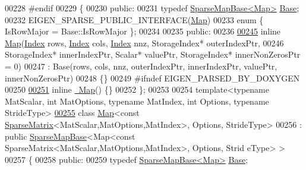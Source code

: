 \begin{DoxyCode}
00228 \textcolor{preprocessor}{#endif}
00229 \{
00230   \textcolor{keyword}{public}:
00231     \textcolor{keyword}{typedef} \hyperlink{class_eigen_1_1_sparse_map_base}{SparseMapBase<Map>} \hyperlink{class_eigen_1_1_sparse_map_base}{Base};
00232     EIGEN\_SPARSE\_PUBLIC\_INTERFACE(\hyperlink{group___core___module_class_eigen_1_1_map}{Map})
00233     \textcolor{keyword}{enum} \{ IsRowMajor = Base::IsRowMajor \};
00234 
00235   \textcolor{keyword}{public}:
00236 
\hyperlink{group___sparse_core___module_a634ffe6952d21716ca879e107f620f19}{00245}     \textcolor{keyword}{inline} \hyperlink{group___sparse_core___module_a634ffe6952d21716ca879e107f620f19}{Map}(\hyperlink{namespace_eigen_a62e77e0933482dafde8fe197d9a2cfde}{Index} rows, \hyperlink{namespace_eigen_a62e77e0933482dafde8fe197d9a2cfde}{Index} cols, \hyperlink{namespace_eigen_a62e77e0933482dafde8fe197d9a2cfde}{Index} nnz, StorageIndex* outerIndexPtr,
00246                StorageIndex* innerIndexPtr, Scalar* valuePtr, StorageIndex* innerNonZerosPtr = 0)
00247       : Base(rows, cols, nnz, outerIndexPtr, innerIndexPtr, valuePtr, innerNonZerosPtr)
00248     \{\}
00249 \textcolor{preprocessor}{#ifndef EIGEN\_PARSED\_BY\_DOXYGEN}
00250 
\hyperlink{group___sparse_core___module_a4d2900fdd8c973d24c4cfb0f0ee4f53f}{00251}     \textcolor{keyword}{inline} \hyperlink{group___sparse_core___module_a4d2900fdd8c973d24c4cfb0f0ee4f53f}{~Map}() \{\}
00252 \};
00253 
00254 \textcolor{keyword}{template}<\textcolor{keyword}{typename} MatScalar, \textcolor{keywordtype}{int} MatOptions, \textcolor{keyword}{typename} MatIndex, \textcolor{keywordtype}{int} Options, \textcolor{keyword}{typename} Str\textcolor{keywordtype}{id}eType>
\hyperlink{class_eigen_1_1_map_3_01const_01_sparse_matrix_3_01_mat_scalar_00_01_mat_options_00_01_mat_index4032bba20cf92aab8bcf07e926e15a4f}{00255} \textcolor{keyword}{class }\hyperlink{group___core___module_class_eigen_1_1_map}{Map}<const \hyperlink{group___sparse_core___module_class_eigen_1_1_sparse_matrix}{SparseMatrix}<MatScalar,MatOptions,MatIndex>, Options, StrideType>
00256   : \textcolor{keyword}{public} \hyperlink{class_eigen_1_1_sparse_map_base}{SparseMapBase}<Map<const SparseMatrix<MatScalar,MatOptions,MatIndex>, Options, Strid
      eType> >
00257 \{
00258   \textcolor{keyword}{public}:
00259     \textcolor{keyword}{typedef} \hyperlink{class_eigen_1_1_sparse_map_base}{SparseMapBase<Map>} \hyperlink{class_eigen_1_1_sparse_map_base}{Base};

\end{DoxyCode}
